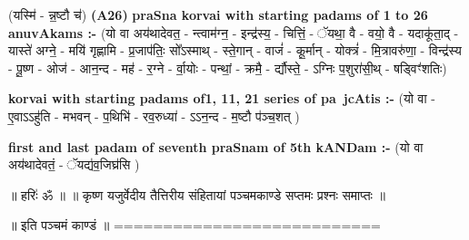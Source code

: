 \documentclass[17pt]{extarticle}
\begin{document}
                  \newline
                      (यस्मि॑ - न्न॒ष्टौ च॑)  \textbf{(A26)} \newline \newline
                \textbf{praSna korvai with starting padams of 1 to 26 anuvAkams :-} \newline
        (यो वा अय॑थादेवत॒ - न्त्वाम॑ग्न॒ - इन्द्र॑स्य॒ - चित्तिं॒ - ॅयथा॒ वै - वयो॒ वै - यदाकू॑ता॒द् - यास्ते॑ अग्ने॒ - मयि॑ गृह्णामि - प्र॒जाप॑तिः॒ सो᳚ऽस्माथ् - स्ते॒गान् - वाजं॑ - कू॒र्मान् - योक्त्रं॑ - मि॒त्रावरु॑णा॒ - विन्द्र॑स्य - पू॒ष्ण - ओज॑ - आन॒न्द - मह॑ - र॒ग्ने - र्वा॒योः - पन्थां॒ - क्रमै॒ - र्द्यौस्ते॒ - ऽग्निः प॒शुरा॑सी॒थ् - षड्विꣳ॑शतिः) \newline

        \textbf{korvai with starting padams of1, 11, 21 series of pa~jcAtis :-} \newline
        (यो वा - ए॒वाऽऽहु॑ति - मभवन् - प॒थिभि॑ - रव॒रुध्या॑ - ऽऽन॒न्द - म॒ष्टौ प॑ञ्च॒शत् ) \newline

        \textbf{first and last padam of seventh praSnam of 5th kANDam :-} \newline
        (यो वा अय॑थादेवतं॒ - ॅयद्य॑व॒जिघ्र॑सि ) \newline 

        
        ॥ हरिः॑ ॐ ॥
॥ कृष्ण यजुर्वेदीय तैत्तिरीय संहितायां पञ्चमकाण्डे सप्तमः प्रश्नः समाप्तः ॥

॥ इति पञ्चमं काण्डं ॥
=========================== \newline
        \pagebreak
                \pagebreak
        
\end{document}

